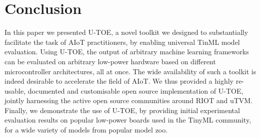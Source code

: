 
\section{Conclusion}
In this paper we presented U-TOE, a novel toolkit we designed to substantially facilitate the task of AIoT practitioners, by enabling universal TinML model evaluation. Using U-TOE, the output of arbitrary machine learning frameworks can be evaluated on arbitrary low-power hardware based on different microcontroller architectures, all at once. The wide availability of such a toolkit is indeed desirable to accelerate the field of AIoT. We thus provided a highly re-usable, documented and customisable open source implementation of U-TOE, jointly harnessing the active open source communities around RIOT and uTVM. Finally, we demonstrate the use of U-TOE, by providing initial experimental evaluation results on popular low-power boards used in the TinyML community, for a wide variety of models from popular model zoo. 
